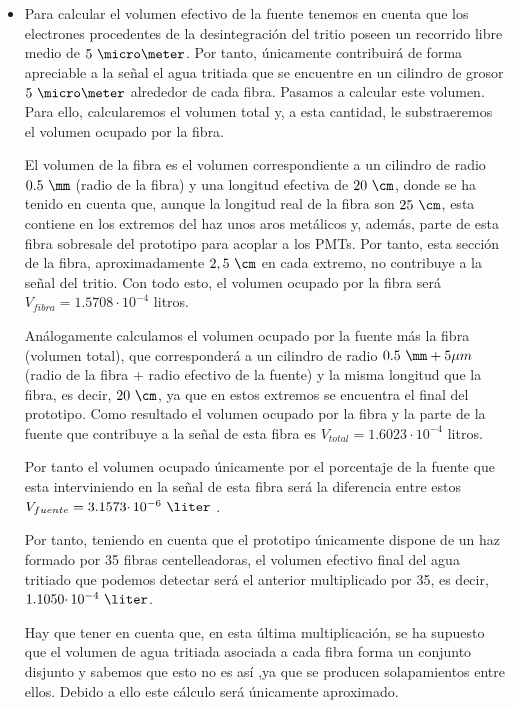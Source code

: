 \begin{itemize}
 \item{} Para calcular el volumen efectivo de la fuente tenemos en cuenta que los electrones procedentes de la desintegración del tritio poseen un recorrido libre medio de $5~\micro\meter$. Por tanto, únicamente contribuirá de forma apreciable a la señal el agua tritiada que se encuentre en  un cilindro de grosor $5~\micro\meter$ alrededor de cada fibra. Pasamos a calcular este volumen. Para ello, calcularemos el volumen total y, a esta cantidad, le substraeremos el volumen ocupado por la fibra.

El volumen de la fibra es el volumen correspondiente a un cilindro de radio $0.5~\mm$ (radio de la fibra) y una longitud efectiva de $20~\cm$, donde se ha tenido en cuenta que, aunque la longitud real de la fibra son $25~\cm$, esta contiene en los extremos del haz unos aros metálicos y, además, parte de esta fibra sobresale del prototipo para acoplar a los PMTs. Por tanto, esta sección de la fibra, aproximadamente $2,5~\cm$ en cada extremo,  no contribuye a la señal del tritio. Con todo esto, el volumen ocupado por la fibra será $V_{fibra}=1.5708 \cdotp 10^{-4}$ litros.

Análogamente calculamos el volumen ocupado por la fuente más la fibra (volumen total), que corresponderá a un cilindro de radio $0.5~\mm+5\mu m$ (radio de la fibra + radio efectivo de la fuente) y la misma longitud que la fibra, es decir, $20~\cm$, ya que en estos extremos se encuentra el final del prototipo. Como resultado el volumen ocupado por la fibra y la parte de la fuente que contribuye a la señal de esta fibra es $V_{total}=1.6023 \cdotp 10^{-4}$ litros. 

Por tanto el volumen ocupado únicamente por el porcentaje de la fuente que esta interviniendo en la señal de esta fibra será la diferencia entre estos $V_{fuente}=3.1573 \cdotp 10^{-6}~\liter$ .
 
Por tanto, teniendo en cuenta que el prototipo únicamente dispone de un haz formado por 35 fibras centelleadoras, el volumen efectivo final del agua tritiado que podemos detectar será el anterior multiplicado por 35, es decir, $1.1050 \cdotp 10^{-4}~\liter$. 

Hay que tener en cuenta que, en esta última multiplicación, se ha supuesto que el volumen de agua tritiada asociada a cada fibra forma un conjunto disjunto y sabemos que esto no es así ,ya que se producen solapamientos entre ellos. Debido a ello este cálculo será únicamente aproximado.


\end{itemize}
